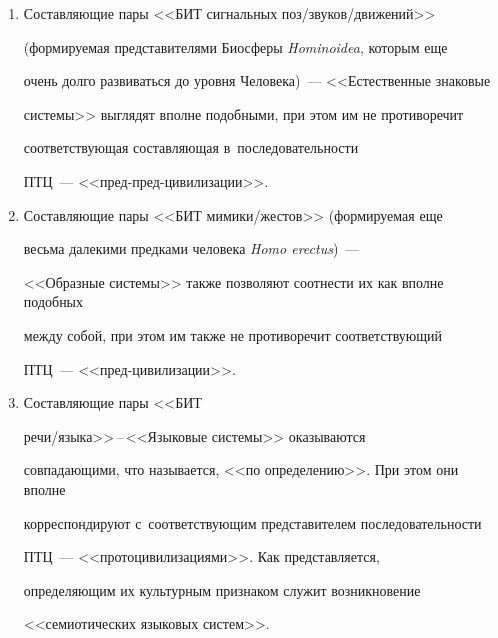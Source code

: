   \begin{enumerate}[1.]


  \item Составляющие пары <<БИТ сигнальных поз\!/\!зву\-ков\!/\!дви\-же\-ний>> 


(формируемая представителями Биосферы \textit{Hominoidea}, которым еще 


очень долго развиваться до уровня Человека)~--- <<Естественные знаковые 


сис\-те\-мы>> выглядят вполне подобными, при этом им не противоречит 


со\-от\-вет\-ст\-ву\-ющая со\-став\-ля\-ющая в~последовательности  


ПТЦ~--- <<пред-пред-ци\-ви\-ли\-за\-ции>>.


  \item Составляющие пары <<БИТ ми\-ми\-ки\!/\!жес\-тов>> (формируемая еще 


весьма далекими предками человека \textit{Homo erectus})~---  


<<Образные сис\-те\-мы>> также позволяют соотнести их как вполне подобных 


между собой, при этом им также не противоречит соответствующий  


ПТЦ~--- <<пред-ци\-ви\-ли\-за\-ции>>.


  \item Составляющие пары <<БИТ  


ре\-чи\!/\!язы\-ка>>\,--\,<<Язы\-ко\-вые сис\-те\-мы>> оказываются 


совпадающими, что называется, <<по определению>>. При этом они вполне 


корреспондируют с~соответствующим представителем последовательности 


ПТЦ~--- <<про\-то\-ци\-ви\-ли\-за\-ци\-ями>>. Как представляется, 


определяющим их культурным признаком служит возникновение 


<<семиотических языковых сис\-тем>>.








\begin{table}\footnotesize


\begin{center}


\tabcolsep=2.5pt


\begin{tabular}{|c|p{22mm}|p{30mm}|p{35mm}|c|p{22mm}|}



\end{tabular}
\end{center}
\end{table}
\end{enumerate}
